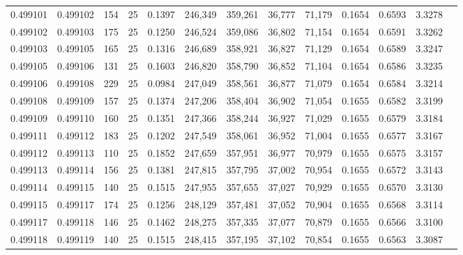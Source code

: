 \begin{tabular}{rrrrrrrrrrrrr}
0.499101 & 0.499102 & 154 &  25 &                                     0.1397 & 246,349 & 359,261 &  36,777 &  71,179 & 0.1654 & 0.6593 & 3.3278 \\
0.499102 & 0.499103 & 175 &  25 &                                     0.1250 & 246,524 & 359,086 &  36,802 &  71,154 & 0.1654 & 0.6591 & 3.3262 \\
0.499103 & 0.499105 & 165 &  25 &                                     0.1316 & 246,689 & 358,921 &  36,827 &  71,129 & 0.1654 & 0.6589 & 3.3247 \\
0.499105 & 0.499106 & 131 &  25 &                                     0.1603 & 246,820 & 358,790 &  36,852 &  71,104 & 0.1654 & 0.6586 & 3.3235 \\
0.499106 & 0.499108 & 229 &  25 &                                     0.0984 & 247,049 & 358,561 &  36,877 &  71,079 & 0.1654 & 0.6584 & 3.3214 \\
0.499108 & 0.499109 & 157 &  25 &                                     0.1374 & 247,206 & 358,404 &  36,902 &  71,054 & 0.1655 & 0.6582 & 3.3199 \\
0.499109 & 0.499110 & 160 &  25 &                                     0.1351 & 247,366 & 358,244 &  36,927 &  71,029 & 0.1655 & 0.6579 & 3.3184 \\
0.499111 & 0.499112 & 183 &  25 &                                     0.1202 & 247,549 & 358,061 &  36,952 &  71,004 & 0.1655 & 0.6577 & 3.3167 \\
0.499112 & 0.499113 & 110 &  25 &                                     0.1852 & 247,659 & 357,951 &  36,977 &  70,979 & 0.1655 & 0.6575 & 3.3157 \\
0.499113 & 0.499114 & 156 &  25 &                                     0.1381 & 247,815 & 357,795 &  37,002 &  70,954 & 0.1655 & 0.6572 & 3.3143 \\
0.499114 & 0.499115 & 140 &  25 &                                     0.1515 & 247,955 & 357,655 &  37,027 &  70,929 & 0.1655 & 0.6570 & 3.3130 \\
0.499115 & 0.499117 & 174 &  25 &                                     0.1256 & 248,129 & 357,481 &  37,052 &  70,904 & 0.1655 & 0.6568 & 3.3114 \\
0.499117 & 0.499118 & 146 &  25 &                                     0.1462 & 248,275 & 357,335 &  37,077 &  70,879 & 0.1655 & 0.6566 & 3.3100 \\
0.499118 & 0.499119 & 140 &  25 &                                     0.1515 & 248,415 & 357,195 &  37,102 &  70,854 & 0.1655 & 0.6563 & 3.3087 \\

\end{tabular}
